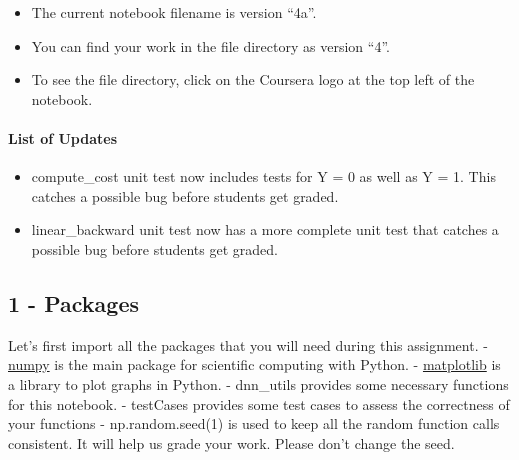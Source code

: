 \documentclass[11pt]{article}
\begin{document}
\begin{itemize}
\itemsep1pt\parskip0pt
\item
  The current notebook filename is version ``4a''.
\item
  You can find your work in the file directory as version ``4''.
\item
  To see the file directory, click on the Coursera logo at the top left
  of the notebook.
\end{itemize}

\paragraph{List of Updates}\label{list-of-updates}

\begin{itemize}
\itemsep1pt\parskip0pt
\item
  compute\_cost unit test now includes tests for Y = 0 as well as Y = 1.
  This catches a possible bug before students get graded.
\item
  linear\_backward unit test now has a more complete unit test that
  catches a possible bug before students get graded.
\end{itemize}

    \subsection{1 - Packages}\label{packages}

Let's first import all the packages that you will need during this
assignment. - \href{www.numpy.org}{numpy} is the main package for
scientific computing with Python. -
\href{http://matplotlib.org}{matplotlib} is a library to plot graphs in
Python. - dnn\_utils provides some necessary functions for this
notebook. - testCases provides some test cases to assess the correctness
of your functions - np.random.seed(1) is used to keep all the random
function calls consistent. It will help us grade your work. Please don't
change the seed.
\end{document}
